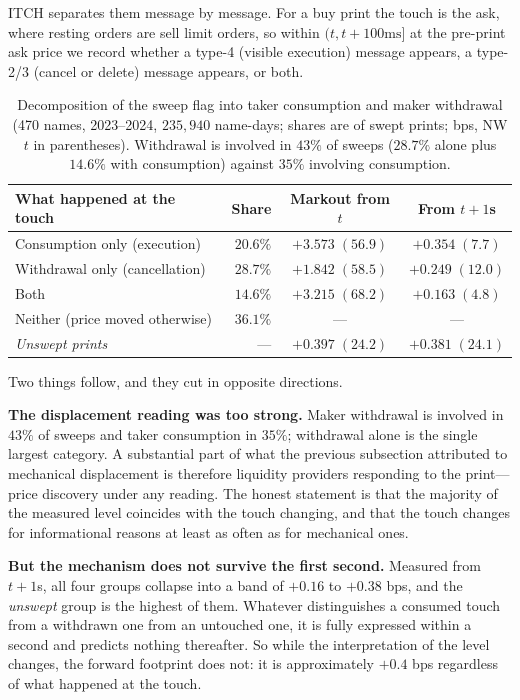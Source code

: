 \documentclass[11pt]{article}
\begin{document}
ITCH separates them message by message. For a buy print the touch is the ask, where resting
orders are sell limit orders, so within $(t, t+100\text{ms}]$ at the pre-print ask price we
record whether a type-4 (visible execution) message appears, a type-2/3 (cancel or delete)
message appears, or both.

\begin{table}[htbp]
\centering
\begin{tabular}{lrcc}
\toprule
\textbf{What happened at the touch} & \textbf{Share} & \textbf{Markout from $t$} & \textbf{From $t+1$s} \\
\midrule
Consumption only (execution) & $20.6\%$ & $+3.573\;(56.9)$ & $+0.354\;(7.7)$ \\
Withdrawal only (cancellation) & $28.7\%$ & $+1.842\;(58.5)$ & $+0.249\;(12.0)$ \\
Both & $14.6\%$ & $+3.215\;(68.2)$ & $+0.163\;(4.8)$ \\
Neither (price moved otherwise) & $36.1\%$ & --- & --- \\
\midrule
\emph{Unswept prints} & --- & $+0.397\;(24.2)$ & $+0.381\;(24.1)$ \\
\bottomrule
\end{tabular}
\caption{Decomposition of the sweep flag into taker consumption and maker withdrawal (470
names, 2023--2024, $235{,}940$ name-days; shares are of swept prints; bps, NW $t$ in
parentheses). Withdrawal is involved in $43\%$ of sweeps ($28.7\%$ alone plus $14.6\%$ with
consumption) against $35\%$ involving consumption.}
\label{tab:consvwdraw}
\end{table}

Two things follow, and they cut in opposite directions.

\textbf{The displacement reading was too strong.} Maker withdrawal is involved in $43\%$ of
sweeps and taker consumption in $35\%$; withdrawal alone is the single largest category. A
substantial part of what the previous subsection attributed to mechanical displacement is
therefore liquidity providers responding to the print---price discovery under any reading.
The honest statement is that the majority of the measured level coincides with the touch
changing, and that the touch changes for informational reasons at least as often as for
mechanical ones.

\textbf{But the mechanism does not survive the first second.} Measured from $t+1$s, all four
groups collapse into a band of $+0.16$ to $+0.38$ bps, and the \emph{unswept} group is the
highest of them. Whatever distinguishes a consumed touch from a withdrawn one from an
untouched one, it is fully expressed within a second and predicts nothing thereafter. So
while the interpretation of the level changes, the forward footprint does not: it is
approximately $+0.4$ bps regardless of what happened at the touch.
\end{document}
